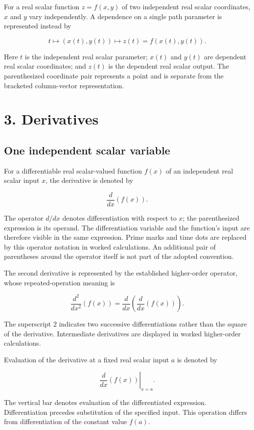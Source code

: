 \documentclass[11pt,oneside,openany]{book}
\begin{document}
For a real scalar function \(z=f(x,y)\) of two independent real scalar
coordinates, \(x\) and \(y\) vary independently. A dependence on a single path
parameter is represented instead by

\[
t\longmapsto (x(t),y(t))\longmapsto z(t)=f(x(t),y(t)).
\]

Here \(t\) is the independent real scalar parameter; \(x(t)\) and \(y(t)\) are
dependent real scalar coordinates; and \(z(t)\) is the dependent real scalar
output. The parenthesized coordinate pair represents a point and is
separate from the bracketed column-vector representation.
\clearpage

\section{3. Derivatives}

\subsection{One independent scalar variable}

For a differentiable real scalar-valued function \(f(x)\) of an independent
real scalar input \(x\), the derivative is denoted by

\[
\frac{d}{dx}\left(f(x)\right).
\]

The operator \(d/dx\) denotes differentiation with respect to \(x\); the
parenthesized expression is its operand. The differentiation variable and
the function's input are therefore visible in the same expression. Prime
marks and time dots are replaced by this operator notation in worked
calculations. An additional pair of parentheses around the operator itself
is not part of the adopted convention.

The second derivative is represented by the established higher-order
operator, whose repeated-operation meaning is

\[
\frac{d^2}{dx^2}\left(f(x)\right)
=\frac{d}{dx}\left(\frac{d}{dx}\left(f(x)\right)\right).
\]

The superscript \(2\) indicates two successive differentiations rather than
the square of the derivative. Intermediate derivatives are displayed in
worked higher-order calculations.

Evaluation of the derivative at a fixed real scalar input \(a\) is denoted by

\[
\left.\frac{d}{dx}\left(f(x)\right)\right|_{x=a}.
\]

The vertical bar denotes evaluation of the differentiated expression.
Differentiation precedes substitution of the specified input. This
operation differs from differentiation of the constant value \(f(a)\).
\clearpage
\end{document}
